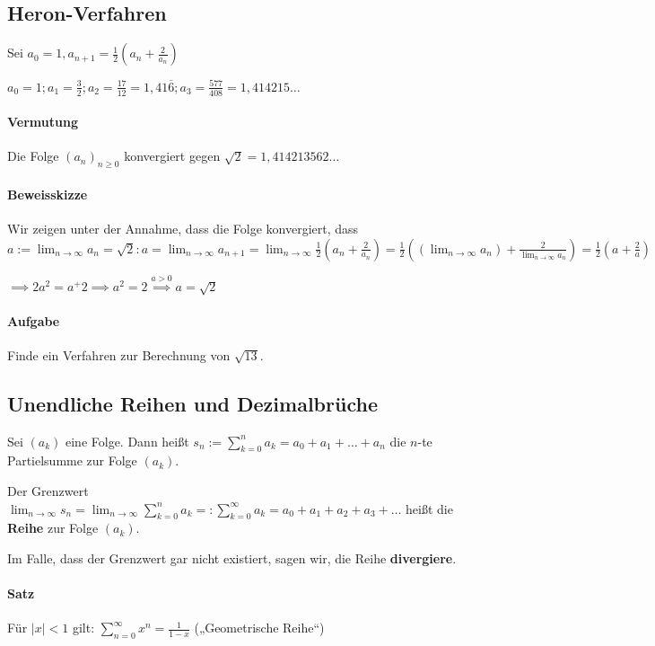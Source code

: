 \documentclass[14pt,a4paper]{article}
\begin{document}
  \subsection{Heron-Verfahren}
  Sei $a_0 = 1, a_{n+1} = \frac{1}{2} ( a_n + \frac{2}{a_n}) $

  $a_0 = 1 ; a_1 = \frac{3}{2} ; a_2 = \frac{17}{12} = 1,41\overline{6} ; a_3 = \frac{577}{408} = 1,414215\ldots $

  \paragraph{Vermutung}
  Die Folge $ (a_n)_{n \geq 0}$ konvergiert gegen $\sqrt{2} = 1,414213562\ldots $

  \paragraph{Beweisskizze}
  Wir zeigen unter der Annahme, dass die Folge konvergiert, dass \\
  $ a := \lim_{n\to \infty} a_n = \sqrt{2} : a = \lim_{n \to \infty} a_{n+1} =
  \lim_{n \to \infty} \frac{1}{2}(a_n + \frac{2}{a_n}) = \frac{1}{2} (( \lim_{n
    \to \infty} a_n) + \frac{2}{\lim_{n \to \infty} a_n}) = \frac{1}{2} ( a +
  \frac{2}{a}) $

  $\implies 2 a^2 = a^+ 2 \implies a^2 = 2 \stackrel{a > 0}{\implies} a =
  \sqrt{2}$

  \paragraph{Aufgabe}
  Finde ein Verfahren zur Berechnung von $\sqrt{13}$.

  \subsection{Unendliche Reihen und Dezimalbrüche}
  Sei $(a_k)$ eine Folge. Dann heißt $s_n := \sum_{k=0}^n a_k = a_0 + a_1 +
  \ldots + a_n$ die $n$-te Partielsumme zur Folge $(a_k)$.

  Der Grenzwert $\lim_{n \to \infty} s_n = \lim_{n \to \infty} \sum_{k=0}^n a_k
  =: \sum_{k=0}^\infty a_k = a_0 + a_1 + a_2 + a_3 + \ldots $ heißt die
  \textbf{Reihe} zur Folge $(a_k)$.

  Im Falle, dass der Grenzwert gar nicht existiert, sagen wir, die Reihe \textbf{divergiere}.

  \paragraph{Satz}
  Für $|x| < 1$ gilt: $ \sum_{n=0}^\infty x^n = \frac{1}{1-x}$ („Geometrische Reihe“)
\end{document}
